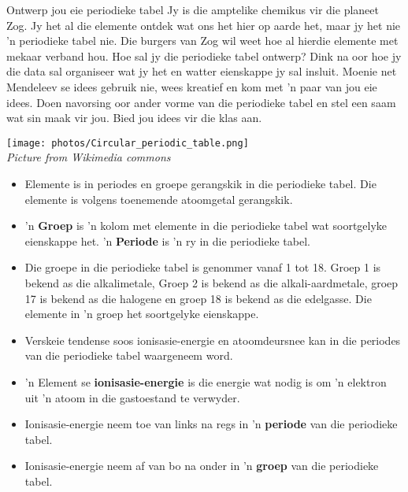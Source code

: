 \begin{activity}{Ontwerp jou eie periodieke tabel}
            \nopagebreak
            \label{m38760*eip-603}
Jy is die amptelike chemikus vir die planeet Zog. Jy het al die elemente ontdek wat ons het hier op aarde het, maar jy het nie 'n periodieke tabel nie. Die burgers van Zog wil weet hoe al hierdie elemente met mekaar verband hou. Hoe sal jy die periodieke tabel ontwerp? Dink na oor hoe jy die data sal organiseer wat jy het en watter eienskappe jy sal insluit. Moenie net Mendeleev se idees gebruik nie, wees kreatief en kom met 'n paar van jou eie idees. Doen navorsing oor ander vorme van die periodieke tabel en stel een saam wat sin maak vir jou. Bied jou idees vir die klas aan.
\begin{center}
\texttt{[image: photos/Circular\_periodic\_table.png]}\\
\textsl{Picture from Wikimedia commons}
\end{center}

\end{activity}
            \nopagebreak
            \label{m38757*uid0123}\begin{itemize}[noitemsep]
            \label{m38757*id79342}\item Elemente is in periodes en groepe gerangskik in die periodieke tabel. Die elemente is volgens toenemende atoomgetal gerangskik.
\label{m38757*id97342}\item 'n \textbf{Groep} is 'n kolom met elemente in die periodieke tabel wat soortgelyke eienskappe het. 'n \textbf{Periode} is 'n ry in die periodieke tabel.
\item Die groepe in die periodieke tabel is genommer vanaf 1 tot 18. Groep 1 is bekend as die alkalimetale, Groep 2 is bekend as die alkali-aardmetale, groep 17 is bekend as die halogene en groep 18 is bekend as die edelgasse. Die elemente in 'n groep het soortgelyke eienskappe.
\item Verskeie tendense soos ionisasie-energie en atoomdeursnee kan in die periodes van die periodieke tabel waargeneem word. \label{m38757*uid184}
\label{m38757*uid186}\item 'n Element se \textbf{ionisasie-energie} is die energie wat nodig is om 'n elektron uit 'n atoom in die gastoestand te verwyder.
\label{m38757*uid187}\item Ionisasie-energie neem toe van links na regs in 'n \textbf{periode} van die periodieke tabel.
\label{m38757*uid188}\item Ionisasie-energie neem af van bo na onder in 'n \textbf{groep} van die periodieke tabel.
\end{itemize}
        \label{m38757*eip-219}
            




